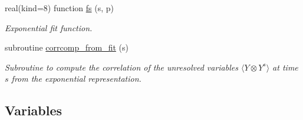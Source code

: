 \begin{DoxyCompactItemize}
real(kind=8) function \hyperlink{namespacecorrmod_a46265e98098a79d33314d5e1f142a91d}{fs} (s, p)
\begin{DoxyCompactList}\small\item\em Exponential fit function. \end{DoxyCompactList}\item 
subroutine \hyperlink{namespacecorrmod_aaffa69da4d652347a8bb9f6030dd76c2}{corrcomp\+\_\+from\+\_\+fit} (s)
\begin{DoxyCompactList}\small\item\em Subroutine to compute the correlation of the unresolved variables $\langle Y \otimes Y^s \rangle$ at time $s$ from the exponential representation. \end{DoxyCompactList}\end{DoxyCompactItemize}
\subsection*{Variables}
